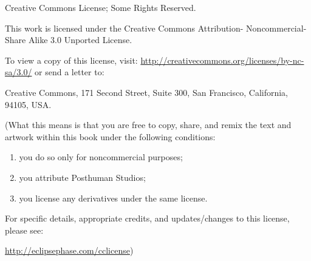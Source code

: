 Creative Commons License; Some Rights Reserved.

This work is licensed under the Creative Commons Attribution-
Noncommercial-Share Alike 3.0 Unported License.

To view a copy of this license, visit:
\url{http://creativecommons.org/licenses/by-nc-sa/3.0/}{} or send a
letter to:

\begin{center}
  Creative Commons, 171 Second Street, Suite 300, San Francisco,
  California, 94105, USA.
\end{center}

(What this means is that you are free to copy, share, and remix the
text and artwork within this book under the following conditions:

\begin{enumerate}
\item you do so only for noncommercial purposes;
\item you attribute Posthuman Studios;
\item you license any derivatives under the same license. 
\end{enumerate}

For specific details, appropriate credits, and updates/changes to this
license, please see:

\begin{center}
  \url{http://eclipsephase.com/cclicense}{})
\end{center}


